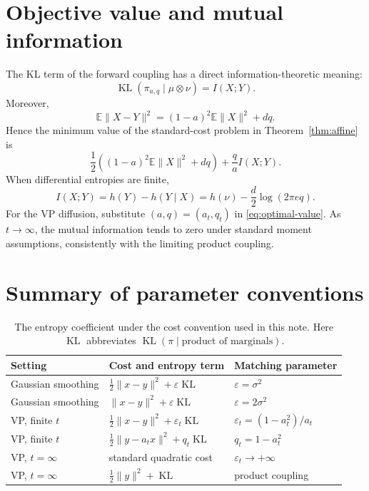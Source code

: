 \documentclass[11pt]{article}
\theoremstyle{remark}
\newcommand{\E}{\mathbb{E}}
\newcommand{\KL}{\operatorname{KL}}
\begin{document}
\section{Objective value and mutual information}

The KL term of the forward coupling has a direct information-theoretic
meaning:
\begin{equation}
  \KL(\pi_{a,q}\mid\mu\otimes\nu)=I(X;Y).
\end{equation}
Moreover,
\begin{equation}
  \E\lVert X-Y\rVert^2
  =(1-a)^2\E\lVert X\rVert^2+dq.
\end{equation}
Hence the minimum value of the standard-cost problem in
Theorem~\ref{thm:affine} is
\begin{equation}
  \label{eq:optimal-value}
  \frac12\left((1-a)^2\E\lVert X\rVert^2+dq\right)
  +\frac qa I(X;Y).
\end{equation}
When differential entropies are finite,
\begin{equation}
  I(X;Y)=h(Y)-h(Y\mid X)
  =h(\nu)-\frac d2\log(2\pi e q).
\end{equation}
For the VP diffusion, substitute $(a,q)=(a_t,q_t)$ in
\eqref{eq:optimal-value}.  As $t\to\infty$, the mutual information tends to
zero under standard moment assumptions, consistently with the limiting
product coupling.

\section{Summary of parameter conventions}

\begin{table}[ht]
  \centering
  \small
  \begin{tabular}{@{}lll@{}}
    \toprule
    Setting & Cost and entropy term & Matching parameter \\
    \midrule
    Gaussian smoothing
      & $\frac12\lVert x-y\rVert^2+\varepsilon\KL$
      & $\varepsilon=\sigma^2$ \\
    Gaussian smoothing
      & $\lVert x-y\rVert^2+\varepsilon\KL$
      & $\varepsilon=2\sigma^2$ \\
    VP, finite $t$
      & $\frac12\lVert x-y\rVert^2+\varepsilon_t\KL$
      & $\varepsilon_t=(1-a_t^2)/a_t$ \\
    VP, finite $t$
      & $\frac12\lVert y-a_tx\rVert^2+q_t\KL$
      & $q_t=1-a_t^2$ \\
    VP, $t=\infty$
      & standard quadratic cost
      & $\varepsilon_t\to+\infty$ \\
    VP, $t=\infty$
      & $\frac12\lVert y\rVert^2+\KL$
      & product coupling \\
    \bottomrule
  \end{tabular}
  \caption{The entropy coefficient under the cost convention used in this
  note.  Here $\KL$ abbreviates $\KL(\pi\mid\text{product of marginals})$.}
  \label{tab:summary}
\end{table}
\end{document}
